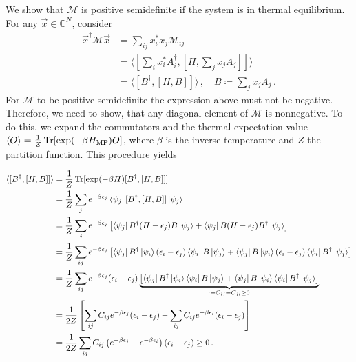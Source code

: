 \documentclass[
    reprint, 
    aps,
    preprintnumbers,
    twocolumn,
    prb,
    superscriptaddress
]{revtex4-2}
\newcommand{\mM}{\mathcal{M}}
\begin{document}
We show that $\mathcal{M}$ is positive semidefinite if the system is in thermal equilibrium.
For any $\vec{x} \in \mathbb{C}^N$, consider
\begin{align}
    \vec{x}^\dagger \mM \vec{x} &= \sum_{ij} x_i^* x_j \mM_{ij} \nonumber \\
        &= \langle \left[ \sum_i x_i^* A_i^\dagger, \left[ H, \sum_j x_j A_j \right] \right]  \rangle \nonumber \\
        &= \langle [B^\dagger, [H, B]] \rangle\,,\quad B \coloneqq  \sum_j x_j A_j\,.
\end{align}
For $\mM$ to be positive semidefinite the expression above must not be negative.
Therefore, we need to show, that any diagonal element of $\mM$ is nonnegative.
To do this, we expand the commutators and the thermal expectation value $\langle O \rangle = \frac{1}{Z} \Trace [\exp(-\beta H_\text{MF}) O]$, 
where $\beta$ is the inverse temperature and $Z$ the partition function.
This procedure yields

\begin{widetext}
    \begin{align}
        \langle [B^\dagger, [H, B]] \rangle &= \frac{1}{Z} \Trace [\exp(-\beta H) [B^\dagger, [H, B]]] \nonumber \\
            &= \frac{1}{Z} \sum_j e^{-\beta \epsilon_j} \bra{\psi_j} [B^\dagger, [H, B]] \ket{\psi_j} \nonumber \\
            &= \frac{1}{Z} \sum_j e^{-\beta \epsilon_j} \left[ \bra{\psi_j} B^\dagger (H - \epsilon_j) B \ket{\psi_j} + \bra{\psi_j} B (H - \epsilon_j) B^\dagger \ket{\psi_j} \right] \nonumber \\
            &= \frac{1}{Z} \sum_{ij} e^{-\beta \epsilon_j} \left[ \bra{\psi_j} B^\dagger \ket{\psi_i} (\epsilon_i - \epsilon_j) \bra{\psi_i} B \ket{\psi_j} + \bra{\psi_j} B \ket{\psi_i} (\epsilon_i - \epsilon_j) \bra{\psi_i} B^\dagger \ket{\psi_j} \right] \nonumber \\
            &= \frac{1}{Z} \sum_{ij} e^{-\beta \epsilon_j} (\epsilon_i - \epsilon_j) \underbrace{ \left[ \bra{\psi_j} B^\dagger \ket{\psi_i} \bra{\psi_i} B \ket{\psi_j} + \bra{\psi_j} B \ket{\psi_i} \bra{\psi_i} B^\dagger \ket{\psi_j} \right]}_{\coloneqq C_{ij} = C_{ji} \geq 0} \nonumber \\
            &= \frac{1}{2Z} \left[ \sum_{ij} C_{ij} e^{-\beta \epsilon_j} (\epsilon_i - \epsilon_j) - \sum_{ij} C_{ij} e^{-\beta \epsilon_i} (\epsilon_i - \epsilon_j) \right] \nonumber \\
            &= \frac{1}{2Z} \sum_{ij} C_{ij} \left( e^{-\beta \epsilon_j} - e^{-\beta \epsilon_i} \right) \left( \epsilon_i - \epsilon_j \right) \geq 0 \,.
    \end{align}
\end{widetext}
\end{document}
